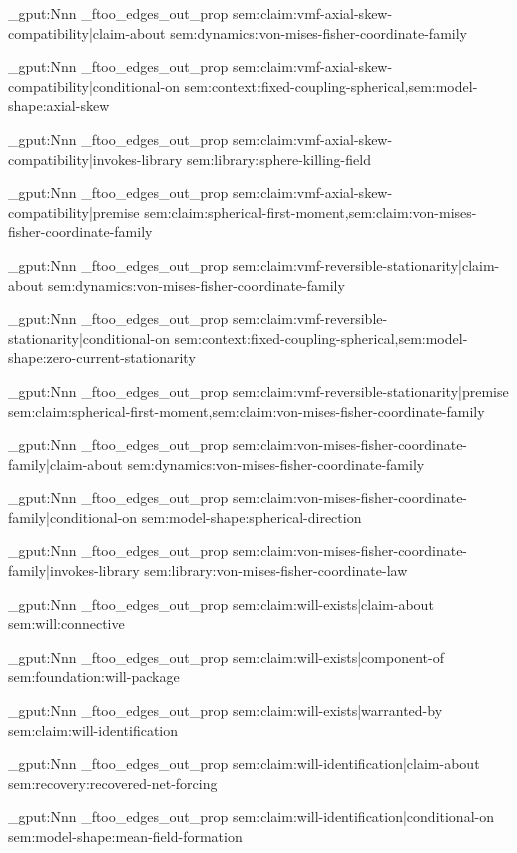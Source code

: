 \prop_gput:Nnn \g_ftoo_edges_out_prop { sem:claim:vmf-axial-skew-compatibility|claim-about } { sem:dynamics:von-mises-fisher-coordinate-family }

\prop_gput:Nnn \g_ftoo_edges_out_prop { sem:claim:vmf-axial-skew-compatibility|conditional-on } { sem:context:fixed-coupling-spherical,sem:model-shape:axial-skew }

\prop_gput:Nnn \g_ftoo_edges_out_prop { sem:claim:vmf-axial-skew-compatibility|invokes-library } { sem:library:sphere-killing-field }

\prop_gput:Nnn \g_ftoo_edges_out_prop { sem:claim:vmf-axial-skew-compatibility|premise } { sem:claim:spherical-first-moment,sem:claim:von-mises-fisher-coordinate-family }

\prop_gput:Nnn \g_ftoo_edges_out_prop { sem:claim:vmf-reversible-stationarity|claim-about } { sem:dynamics:von-mises-fisher-coordinate-family }

\prop_gput:Nnn \g_ftoo_edges_out_prop { sem:claim:vmf-reversible-stationarity|conditional-on } { sem:context:fixed-coupling-spherical,sem:model-shape:zero-current-stationarity }

\prop_gput:Nnn \g_ftoo_edges_out_prop { sem:claim:vmf-reversible-stationarity|premise } { sem:claim:spherical-first-moment,sem:claim:von-mises-fisher-coordinate-family }

\prop_gput:Nnn \g_ftoo_edges_out_prop { sem:claim:von-mises-fisher-coordinate-family|claim-about } { sem:dynamics:von-mises-fisher-coordinate-family }

\prop_gput:Nnn \g_ftoo_edges_out_prop { sem:claim:von-mises-fisher-coordinate-family|conditional-on } { sem:model-shape:spherical-direction }

\prop_gput:Nnn \g_ftoo_edges_out_prop { sem:claim:von-mises-fisher-coordinate-family|invokes-library } { sem:library:von-mises-fisher-coordinate-law }

\prop_gput:Nnn \g_ftoo_edges_out_prop { sem:claim:will-exists|claim-about } { sem:will:connective }

\prop_gput:Nnn \g_ftoo_edges_out_prop { sem:claim:will-exists|component-of } { sem:foundation:will-package }

\prop_gput:Nnn \g_ftoo_edges_out_prop { sem:claim:will-exists|warranted-by } { sem:claim:will-identification }

\prop_gput:Nnn \g_ftoo_edges_out_prop { sem:claim:will-identification|claim-about } { sem:recovery:recovered-net-forcing }

\prop_gput:Nnn \g_ftoo_edges_out_prop { sem:claim:will-identification|conditional-on } { sem:model-shape:mean-field-formation }

